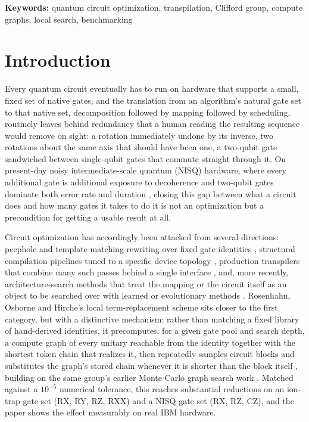 \documentclass[11pt]{article}
\begin{document}
\noindent\textbf{Keywords:} quantum circuit optimization, transpilation,
Clifford group, compute graphs, local search, benchmarking

\section{Introduction}
\label{sec:intro}

Every quantum circuit eventually has to run on hardware that supports a
small, fixed set of native gates, and the translation from an algorithm's
natural gate set to that native set, decomposition followed by mapping
followed by scheduling, routinely leaves behind redundancy that a human
reading the resulting sequence would remove on sight: a rotation
immediately undone by its inverse, two rotations about the same axis that
should have been one, a two-qubit gate sandwiched between single-qubit
gates that commute straight through it. On present-day noisy
intermediate-scale quantum (NISQ) hardware, where every additional gate is
additional exposure to decoherence and two-qubit gates dominate both error
rate and duration \cite{Preskill2018NISQ,Arute2019Supremacy,Cross2019QuantumVolume},
closing this gap between what a circuit does and how many gates it takes to
do it is not an optimization but a precondition for getting a usable result
at all.

Circuit optimization has accordingly been attacked from several directions:
peephole and template-matching rewriting over fixed gate identities
\cite{Nam2018Automated,Amy2014TDepth,ZulehnerPalerWille2018}, structural
compilation pipelines tuned to a specific device topology
\cite{Maslov2017IonTrap,Murali2020TrappedIon,BlumRoli2003Metaheuristics},
production transpilers that combine many such passes behind a single
interface \cite{JavadiAbhari2024Qiskit,Sivarajah2020Tket,Younis2021BQSKit},
and, more recently, architecture-search methods that treat the mapping or
the circuit itself as an object to be searched over with learned or
evolutionary methods
\cite{Martyniuk2024QASSurvey,Zhu2023QASSurvey,Zhang2021NeuralPredictorQAS,Zhang2022DifferentiableQAS,He2024TrainingFreeQAS,Brandhofer2021Rydberg,Datta2022_2DMapping,Datta2022_HexMapping}.
Rosenhahn, Osborne and Hirche's local term-replacement scheme sits closer
to the first category, but with a distinctive mechanism: rather than
matching a fixed library of hand-derived identities, it precomputes, for a
given gate pool and search depth, a compute graph of every unitary reachable
from the identity together with the shortest token chain that realizes it,
then repeatedly samples circuit blocks and substitutes the graph's stored
chain whenever it is shorter than the block itself
\cite{Rosenhahn2025Optimization}, building on the same group's earlier
Monte Carlo graph search work \cite{RosenhahnTobias2023MCGS}. Matched
against a $10^{-5}$ numerical tolerance, this reaches substantial
reductions on an ion-trap gate set (RX, RY, RZ, RXX) and a NISQ gate set
(RX, RZ, CZ), and the paper shows the effect measurably on real IBM
hardware.
\end{document}
